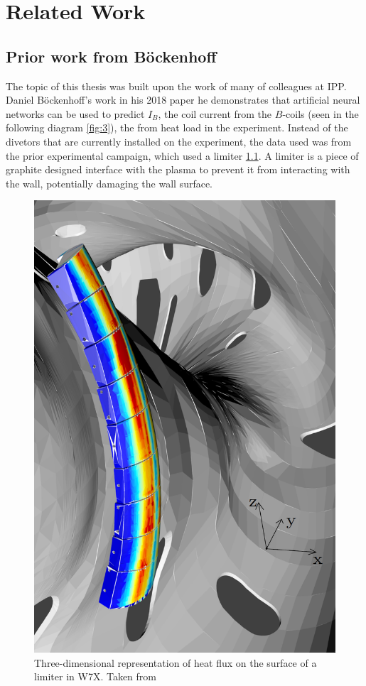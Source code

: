 %
\chapter{Related Work}
\label{sec:related}

\section{Prior work from Böckenhoff}

The topic of this thesis was built upon the work of many of colleagues at IPP. Daniel Böckenhoff's work in his 2018 paper \cite{Böckenhoff_2018} he demonstrates that artificial neural networks can be used to predict $I_B$, the coil current from the $B$-coils (seen in the following diagram \ref{fig:3}), the from heat load in the experiment. Instead of the divetors that are currently installed on the experiment, the data used was from the prior experimental campaign, which used a limiter \ref{fig:limiter}. A limiter is a piece of graphite designed interface with the plasma to prevent it from interacting with the wall, potentially damaging the wall surface.

\begin{figure}[!htb]
	\centering
	\includegraphics[scale = 0.7]{images/limiter.png}
	\caption{Three-dimensional representation of heat flux on the surface of a limiter in W7X. Taken from \cite{Böckenhoff_2018}} \label{fig:limiter}
\end{figure}

